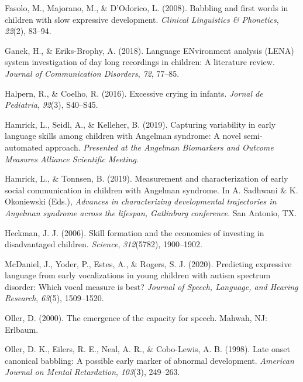 \documentclass[english,,man]{apa6}
\begin{document}
\leavevmode\hypertarget{ref-fasolo2008babbling}{}%
Fasolo, M., Majorano, M., \& D'Odorico, L. (2008). Babbling and first words in children with slow expressive development. \emph{Clinical Linguistics \& Phonetics}, \emph{22}(2), 83--94.

\leavevmode\hypertarget{ref-ganek2018language}{}%
Ganek, H., \& Eriks-Brophy, A. (2018). Language ENvironment analysis (LENA) system investigation of day long recordings in children: A literature review. \emph{Journal of Communication Disorders}, \emph{72}, 77--85.

\leavevmode\hypertarget{ref-halpern2016excessive}{}%
Halpern, R., \& Coelho, R. (2016). Excessive crying in infants. \emph{Jornal de Pediatria}, \emph{92}(3), S40--S45.

\leavevmode\hypertarget{ref-hamrick2019capturing}{}%
Hamrick, L., Seidl, A., \& Kelleher, B. (2019). Capturing variability in early language skills among children with Angelman syndrome: A novel semi-automated approach. \emph{Presented at the Angelman Biomarkers and Outcome Measures Alliance Scientific Meeting}.

\leavevmode\hypertarget{ref-hamrick2019measurement}{}%
Hamrick, L., \& Tonnsen, B. (2019). Measurement and characterization of early social communication in children with Angelman syndrome. In A. Sadhwani \& K. Okoniewski (Eds.), \emph{Advances in characterizing developmental trajectories in Angelman syndrome across the lifespan, Gatlinburg conference}. San Antonio, TX.

\leavevmode\hypertarget{ref-heckman2006skill}{}%
Heckman, J. J. (2006). Skill formation and the economics of investing in disadvantaged children. \emph{Science}, \emph{312}(5782), 1900--1902.

\leavevmode\hypertarget{ref-mcdaniel2020predicting}{}%
McDaniel, J., Yoder, P., Estes, A., \& Rogers, S. J. (2020). Predicting expressive language from early vocalizations in young children with autism spectrum disorder: Which vocal measure is best? \emph{Journal of Speech, Language, and Hearing Research}, \emph{63}(5), 1509--1520.

\leavevmode\hypertarget{ref-oller2000emergence}{}%
Oller, D. (2000). The emergence of the capacity for speech. Mahwah, NJ: Erlbaum.

\leavevmode\hypertarget{ref-oller1998late}{}%
Oller, D. K., Eilers, R. E., Neal, A. R., \& Cobo-Lewis, A. B. (1998). Late onset canonical babbling: A possible early marker of abnormal development. \emph{American Journal on Mental Retardation}, \emph{103}(3), 249--263.
\end{document}
